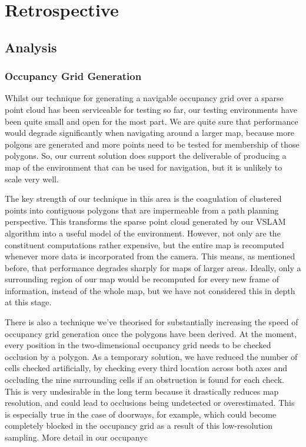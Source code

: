 \documentclass[10pt,english]{article}
\begin{document}
\clearpage

\section*{Retrospective}

\subsection*{Analysis}


\subsubsection*{Occupancy Grid Generation}

Whilst our technique for generating a navigable occupancy grid over a sparse point cloud has been serviceable for testing so far, our testing environments have been quite small and open for the most part. We are quite sure that performance would degrade significantly when navigating around a larger map, because more polgons are generated and more points need to be tested for membership of those polygons. So, our current solution does support the deliverable of producing a map of the environment that can be used for navigation, but it is unlikely to scale very well.

The key strength of our technique in this area is the coagulation of clustered points into contiguous polygons that are impermeable from a path planning perspective. This transforms the sparse point cloud generated by our VSLAM algorithm into a useful model of the environment. However, not only are the constituent computations rather expensive, but the entire map is recomputed whenever more data is incorporated from the camera. This means, as mentioned before, that performance degrades sharply for maps of larger areas. Ideally, only a surrounding region of our map would be recomputed for every new frame of information, instead of the whole map, but we have not considered this in depth at this stage.

There is also a technique we've theorised for substantially increasing the speed of occupancy grid generation once the polygons have been derived. At the moment, every position in the two-dimensional occupancy grid needs to be checked occlusion by a polygon. As a temporary solution, we have reduced the number of cells checked artificially, by checking every third location across both axes and occluding the nine surrounding cells if an obstruction is found for each check. This is very undesirable in the long term because it drastically reduces map resolution, and could lead to occlusions being undetected or overestimated. This is especially true in the case of doorways, for example, which could become completely blocked in the occupancy grid as a result of this low-resolution sampling. More detail in our occupanyc
\end{document}
